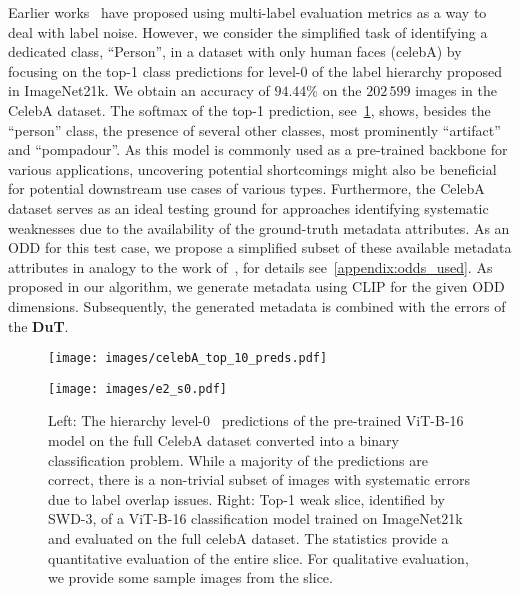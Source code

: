 Earlier works~\citep{beyer2020we, shankar2020evaluating} have proposed using multi-label evaluation metrics as a way to deal with label noise. However, we consider the simplified task of identifying a dedicated class, ``Person'', in a dataset with only human faces (celebA) by focusing on the top-1 class predictions for level-0 of the label hierarchy proposed in ImageNet21k.
We obtain an accuracy of $94.44\%$ on the $202\,599$ images in the CelebA dataset. The softmax of the top-1 prediction, see~\cref{fig:celebA}, shows, besides the ``person'' class, the presence of several other classes, most prominently ``artifact'' and ``pompadour''.
As this model is commonly used as a pre-trained backbone for various applications, uncovering potential shortcomings might also be beneficial for potential downstream use cases of various types.
Furthermore, the CelebA dataset serves as an ideal testing ground for approaches identifying systematic weaknesses due to the availability of the ground-truth metadata attributes.
As an ODD for this test case, we propose a simplified subset of these available metadata attributes in analogy to the work of~\citet{gannamaneni2023investigating}, for details see~\cref{appendix:odds_used}.
As proposed in our algorithm, we generate metadata using CLIP for the given ODD dimensions.
Subsequently, the generated metadata is combined with the errors of the \textbf{DuT}. 

\begin{figure}
\begin{minipage}{0.45\textwidth}
  \texttt{[image: images/celebA\_top\_10\_preds.pdf]} %
\end{minipage}%
\hfill %
\begin{minipage}{0.45\textwidth}
  \texttt{[image: images/e2\_s0.pdf]} %
  
\end{minipage}
\caption{Left: The hierarchy level-0~\citep{ridnik2021imagenet} predictions of the pre-trained ViT-B-16 model on the full CelebA dataset converted into a binary classification problem. While a majority of the predictions are correct, there is a non-trivial subset of images with systematic errors due to label overlap issues. Right: Top-1 weak slice, identified by SWD-3, of a ViT-B-16 classification model trained on ImageNet21k and evaluated on the full celebA dataset. The statistics provide a quantitative evaluation of the entire slice. For qualitative evaluation, we provide some sample images from the slice.}
\label{fig:celebA}
\end{figure}




